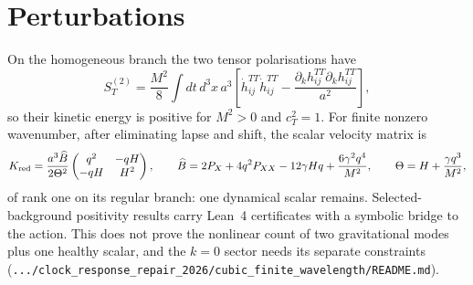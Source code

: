 \documentclass[11pt,letterpaper]{article}
\begin{document}
\section{Perturbations}
On the homogeneous branch the two tensor polarisations have
\begin{equation}
S^{(2)}_T=\frac{M^2}{8}\int dt\,d^3x\,a^3\left[\dot h^{TT}_{ij}\dot h^{TT}_{ij}-\frac{\partial_kh^{TT}_{ij}\partial_kh^{TT}_{ij}}{a^2}\right],
\end{equation}
so their kinetic energy is positive for $M^2>0$ and $c_T^2=1$. For finite nonzero wavenumber, after eliminating lapse and shift, the scalar velocity matrix is
\begin{equation}
K_{\rm red}=\frac{a^3\widehat B}{2\Theta^2}\begin{pmatrix}q^2&-qH\\-qH&H^2\end{pmatrix},\qquad \widehat B=2P_X+4q^2P_{XX}-12\gamma Hq+\frac{6\gamma^2q^4}{M^2},\qquad \Theta=H+\frac{\gamma q^3}{M^2},
\end{equation}
of rank one on its regular branch: one dynamical scalar remains. Selected-background positivity results carry Lean~4 certificates with a symbolic bridge to the action. This does not prove the nonlinear count of two gravitational modes plus one healthy scalar, and the $k=0$ sector needs its separate constraints (\texttt{.../clock\_response\_repair\_2026/cubic\_finite\_wavelength/README.md}).
\end{document}
